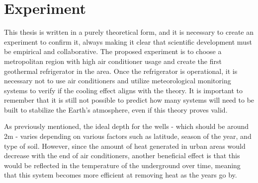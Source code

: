 \section{Experiment}

This thesis is written in a purely theoretical form, and it is necessary to create an experiment to confirm it, always making it clear that scientific development must be empirical and collaborative. The proposed experiment is to choose a metropolitan region with high air conditioner usage and create the first geothermal refrigerator in the area. Once the refrigerator is operational, it is necessary not to use air conditioners and utilize meteorological monitoring systems to verify if the cooling effect aligns with the theory. It is important to remember that it is still not possible to predict how many systems will need to be built to stabilize the Earth's atmosphere, even if this theory proves valid.

As previously mentioned, the ideal depth for the wells - which should be around 2m - varies depending on various factors such as latitude, season of the year, and type of soil. However, since the amount of heat generated in urban areas would decrease with the end of air conditioners, another beneficial effect is that this would be reflected in the temperature of the underground over time, meaning that this system becomes more efficient at removing heat as the years go by.